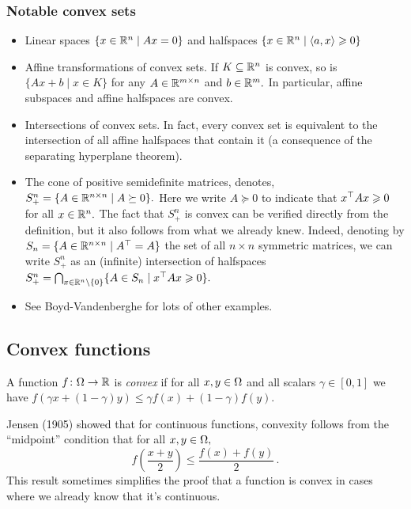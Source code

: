 \subsubsection{Notable convex sets}
\begin{itemize}
\item Linear spaces $\{x\in\mathbb{R}^n\mid Ax=0\}$ and halfspaces $\{x\in\mathbb{R}^n \mid \langle a, x\rangle \geqslant 0 \}$
\item Affine transformations of convex sets. If $K\subseteq\mathbb{R}^n$ is convex, so is $\{Ax+b\mid x\in K\}$ for any $A\in\mathbb{R}^{m\times n}$ and $b\in\mathbb{R}^m.$
In particular, affine subspaces and affine halfspaces are convex.
\item Intersections of convex sets. In fact, every convex set is equivalent to the intersection of all affine halfspaces that contain it (a consequence of the separating hyperplane theorem).
\item The cone of positive semidefinite matrices, denotes, $S^n_+ = \{ A\in\mathbb{R}^{n\times n}\mid A\succeq 0\}.$ Here we write $A\succeq 0$ to indicate that $x^\top A x\geqslant 0$ for all $x\in\mathbb{R}^n.$ The fact that $S^n_+$ is convex can be verified directly from the definition, but it also follows from what we already knew. 
Indeed, denoting by $S_n=\{A\in\mathbb{R}^{n\times n}\mid A^\top = A\}$ the set of all $n\times n$ symmetric matrices, we can write $S^n_+$ as an (infinite) intersection of halfspaces $S^n_+=\bigcap_{x\in\mathbb{R}^n\backslash\{0\}} \{ A\in S_n\mid x^\top A x\geqslant 0\}.$
\item See Boyd-Vandenberghe for lots of other examples.
\end{itemize}

\subsection{Convex functions}

\begin{definition}
A function $f\colon\Omega\to\mathbb{R}$ is \emph{convex} if for all $x,y\in\Omega$ and all scalars $\gamma\in[0,1]$ we have $f(\gamma x+(1-\gamma)y)\le \gamma f(x)+(1-\gamma)f(y).$
\end{definition}

Jensen (1905) showed that for continuous functions, convexity follows from the ``midpoint'' condition that for all $x,y\in\Omega,$
\[
f\left(\frac{x+y}2\right)\le \frac{f(x)+f(y)}2\,.
\]
This result sometimes simplifies the proof that a function is convex in cases where we already know that it's continuous.

